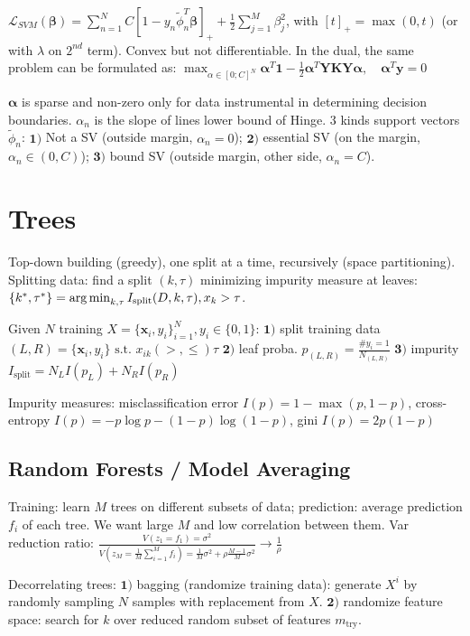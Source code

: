 \documentclass[10pt,a4paper,landscape]{extarticle}
\renewcommand{\bf}[1]{\ensuremath{\mathbf{#1}}}
\newcommand{\balpha}{\boldsymbol\alpha}
\newcommand{\bbeta}{\boldsymbol\beta}
\begin{document}
\begin{multicols*}{4}
$\mathcal{L}_{SVM} (\bbeta)= \sum_{n=1}^N C[1 - y_n \tilde\phi_n^T \bbeta]_{+} + \frac{1}{2} \sum_{j=1}^M \beta_j^2$, with $[t]_{+} = \max(0, t)$ (or with $\lambda$ on $2^{nd}$ term). 
Convex but not differentiable. In the dual, the same problem can be formulated as:
$\max_{\alpha \in [0; C]^N} \balpha^T \bf{1} - \frac{1}{2} \balpha^T \bf{Y K Y} \balpha , \quad \balpha^T \bf{y} = 0$

$\balpha$ is sparse and non-zero only for data instrumental in determining decision boundaries. $\alpha_n$ is the slope of lines lower bound of Hinge. 3 kinds support vectors $\tilde{\phi}_n$: $\bf{1)}$ Not a SV (outside margin, $\alpha_n = 0$); $\bf{2)}$ essential SV (on the margin, $\alpha_n \in (0,C)$); $\bf{3)}$ bound SV (outside margin, other side, $\alpha_n = C$).

\section{Trees}
Top-down building (greedy), one split at a time, recursively (space partitioning).
Splitting data: find a split $(k, \tau)$ minimizing impurity measure at leaves: $\{ k^*, \tau^* \} = \operatorname*{arg\,min}_{k, \tau} I_{\text{split}} (D, k, \tau), x_k > \tau$.

Given $N$ training $X=\{\bf{x}_i, y_i\}^N_{i=1}, y_i \in \{0,1\}$:
$\bf{1)}$ split training data $(L,R) = \{\bf{x}_i, y_i\} \text{ s.t. } x_{ik} (>,\leq) \tau$
$\bf{2)}$ leaf proba. $p_{(L,R)} = \frac{\#y_i = 1}{N_{(L,R)}}$
$\bf{3)}$ impurity $I_{\text{split}} = N_L I(p_L) + N_R I(p_R)$

Impurity measures: misclassification error $I(p) = 1 - \max (p, 1-p)$, cross-entropy $I(p) = -p \log p - (1-p) \log (1-p)$, gini $I(p) = 2p(1-p)$

\subsection{Random Forests / Model Averaging}
Training: learn $M$ trees on different subsets of data; prediction: average prediction $f_i$ of each tree. We want large $M$ and low correlation between them. Var reduction ratio: $\frac{V(z_1 = f_1) = \sigma^2}{V(z_M = \frac{1}{M} \sum_{i=1}^M f_i) = \frac{1}{M} \sigma^2 + \rho \frac{M-1}{M} \sigma^2} \rightarrow \frac{1}{\rho}$

Decorrelating trees: 
$\bf{1)}$ bagging (randomize training data): generate $X^i$ by randomly sampling $N$ samples with replacement from $X$.
$\bf{2)}$ randomize feature space: search for $k$ over reduced random subset of features $m_{\text{try}}$.


\end{multicols*}
\end{document}

